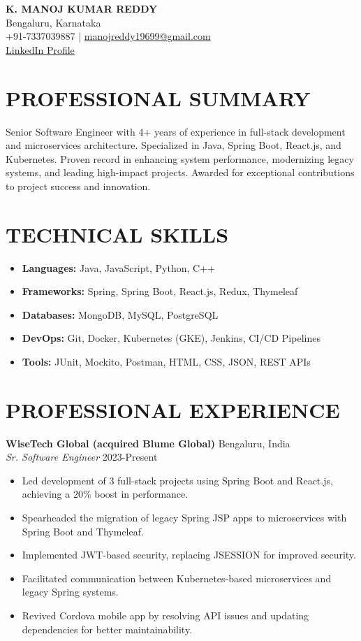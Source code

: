 \documentclass[a4paper,10pt]{article}
\begin{document}
\begin{center}
    \textbf{\huge K. MANOJ KUMAR REDDY} \\[0.2cm]
    Bengaluru, Karnataka \\
    +91-7337039887 | \href{mailto:manojreddy19699@gmail.com}{manojreddy19699@gmail.com} \\
    \href{https://www.linkedin.com/in/manoj-reddy-40081415a/}{LinkedIn Profile}
\end{center}

\section*{PROFESSIONAL SUMMARY}
\noindent
Senior Software Engineer with 4+ years of experience in full-stack development and microservices architecture. Specialized in Java, Spring Boot, React.js, and Kubernetes. Proven record in enhancing system performance, modernizing legacy systems, and leading high-impact projects. Awarded for exceptional contributions to project success and innovation.

\section*{TECHNICAL SKILLS}
\begin{itemize}[left=0pt, label={}]
    \item \textbf{Languages:} Java, JavaScript, Python, C++
    \item \textbf{Frameworks:} Spring, Spring Boot, React.js, Redux, Thymeleaf
    \item \textbf{Databases:} MongoDB, MySQL, PostgreSQL
    \item \textbf{DevOps:} Git, Docker, Kubernetes (GKE), Jenkins, CI/CD Pipelines
    \item \textbf{Tools:} JUnit, Mockito, Postman, HTML, CSS, JSON, REST APIs
\end{itemize}

\section*{PROFESSIONAL EXPERIENCE}
\noindent
\textbf{WiseTech Global (acquired Blume Global)} \hfill Bengaluru, India \\
\textit{Sr. Software Engineer} \hfill 2023-Present
\begin{itemize}
    \item Led development of 3 full-stack projects using Spring Boot and React.js, achieving a 20\% boost in performance.
    \item Spearheaded the migration of legacy Spring JSP apps to microservices with Spring Boot and Thymeleaf.
    \item Implemented JWT-based security, replacing JSESSION for improved security.
    \item Facilitated communication between Kubernetes-based microservices and legacy Spring systems.
    \item Revived Cordova mobile app by resolving API issues and updating dependencies for better maintainability.
\end{itemize}
\end{document}
